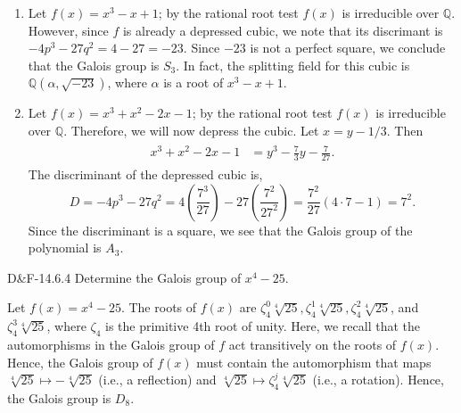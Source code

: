 \documentclass{article}
\begin{document}
\begin{solutions}
\begin{enumerate}[itemsep =-2pt,label = (\alph{*})]
		\item Let $f(x) = x^{3} - x + 1$; by the rational root test $f(x)$ is irreducible over $\mathbb{Q}$. However, since $f$ is already a depressed cubic, we note that its discrimant is $-4p^{3} - 27q^{2} = 4 - 27 = -23$. Since $-23$ is not a perfect square, we conclude that the Galois group is $S_{3}$. In fact, the splitting field for this cubic is $\mathbb{Q}(\alpha, \sqrt{-23})$, where $\alpha$ is a root of $x^{3} - x + 1$. 
		\item Let $f(x) = x^{3} + x^{2} - 2x - 1$; by the rational root test $f(x)$ is irreducible over $\mathbb{Q}$. Therefore, we will now depress the cubic. Let $x = y - 1/3$. Then 
			\begin{align}
				\begin{split}
					x^{3} + x^{2} - 2x - 1 &= y^{3} - \frac{7}{3}y - \frac{7}{27}. 
				\end{split}
			\end{align}
		The discriminant of the depressed cubic is, 
			\begin{equation}
				D = -4p^{3} - 27q^{2} = 4\left(\frac{7^{3}}{27}\right) - 27\left(\frac{7^{2}}{27^{2}}\right) = \frac{7^{2}}{27}\left(4 \cdot 7 - 1\right) = 7^{2}. 
			\end{equation}
		Since the discriminant is a square, we see that the Galois group of the polynomial is $A_{3}$. 
	\end{enumerate}
\end{solutions}
\begin{prb}{D\&F-14.6.4}
	Determine the Galois group of $x^{4} - 25$. 
\end{prb}
\begin{solutions}
	Let $f(x) = x^{4} - 25$. The roots of $f(x)$ are $\zeta_{4}^{0}\sqrt[4]{25}, \zeta_{4}^{1}\sqrt[4]{25}, \zeta_{4}^{2}\sqrt[4]{25}$, and $\zeta_{4}^{3}\sqrt[4]{25}$, where $\zeta_{4}$ is the primitive 4th root of unity. Here, we recall that the automorphisms in the Galois group of $f$ act transitively on the roots of $f(x)$. Hence, the Galois group of $f(x)$ must contain the automorphism that maps $\sqrt[4]{25} \mapsto -\sqrt[4]{25}$ (i.e., a reflection) and $\sqrt[4]{25} \mapsto \zeta_{4}^{j}\sqrt[4]{25}$ (i.e., a rotation). Hence, the Galois group is $D_{8}$. 
\end{solutions}
\end{document}
